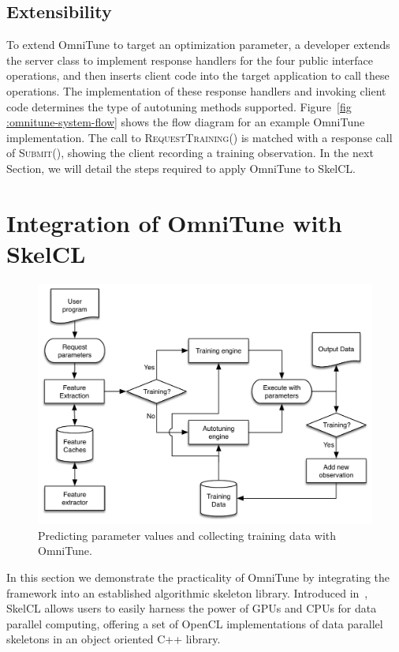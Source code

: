\documentclass[nonatbib,preprint,nocopyrightspace,9pt]{sigplanconf}
\begin{document}
\subsection{Extensibility}

To extend OmniTune to target an optimization parameter, a developer extends the
server class to implement response handlers for the four public interface
operations, and then inserts client code into the target application to call
these operations. The implementation of these response handlers and invoking
client code determines the type of autotuning methods supported. Figure~\ref{fig
:omnitune-system-flow} shows the flow diagram for an example OmniTune
implementation. The call to \textsc{RequestTraining()} is matched with a
response call of \textsc{Submit()}, showing the client recording a training
observation. In the next Section, we will detail the steps required to apply
OmniTune to SkelCL.


\section{Integration of OmniTune with SkelCL}\label{sec:omnitune-skelcl}

\begin{figure}
\centering
\includegraphics[width=\columnwidth]{img/omnitune-system-flow.pdf}
\caption{%
  Predicting parameter values and collecting training data with OmniTune.%
}
\label{fig:omnitune-system-flow}
\end{figure}

In this section we demonstrate the practicality of OmniTune by integrating the
framework into an established algorithmic skeleton library. Introduced
in~\cite{Steuwer2011}, SkelCL allows users to easily harness the power of GPUs
and CPUs for data parallel computing, offering a set of OpenCL implementations
of data parallel skeletons in an object oriented C++ library.
\end{document}
